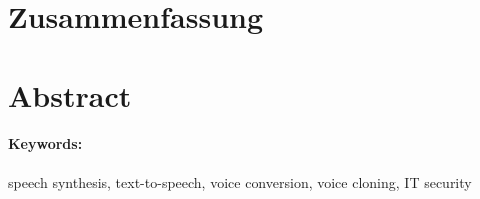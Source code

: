 \newpage
\thispagestyle{empty}
\section*{Zusammenfassung}


\newpage
\thispagestyle{empty}
\section*{Abstract}

\paragraph{Keywords:}
speech synthesis, text-to-speech, voice conversion, voice cloning, IT security
